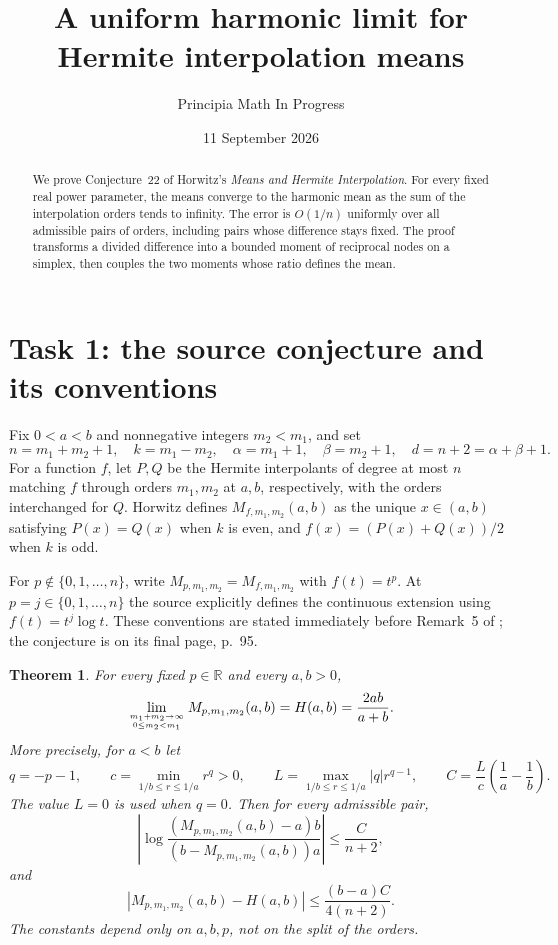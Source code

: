 \documentclass[11pt]{article}
\title{A uniform harmonic limit for Hermite interpolation means}
\author{Principia Math In Progress}
\date{11 September 2026}
\newtheorem{theorem}{Theorem}
\begin{document}
\maketitle

\begin{abstract}
We prove Conjecture~22 of Horwitz's \emph{Means and Hermite Interpolation}.
For every fixed real power parameter, the means converge to the harmonic
mean as the sum of the interpolation orders tends to infinity. The error
is $O(1/n)$ uniformly over all admissible pairs of orders, including pairs
whose difference stays fixed. The proof transforms a divided difference
into a bounded moment of reciprocal nodes on a simplex, then couples the
two moments whose ratio defines the mean.
\end{abstract}

\section*{Task 1: the source conjecture and its conventions}
Fix $0<a<b$ and nonnegative integers $m_2<m_1$, and set
\[
n=m_1+m_2+1,\quad k=m_1-m_2,\quad
\alpha=m_1+1,\quad\beta=m_2+1,\quad d=n+2=\alpha+\beta+1.
\]
For a function $f$, let $P,Q$ be the Hermite interpolants of degree at most
$n$ matching $f$ through orders $m_1,m_2$ at $a,b$, respectively, with
the orders interchanged for $Q$. Horwitz defines $M_{f,m_1,m_2}(a,b)$
as the unique $x\in(a,b)$ satisfying $P(x)=Q(x)$ when $k$ is even, and
$f(x)=(P(x)+Q(x))/2$ when $k$ is odd.

For $p\notin\{0,1,\ldots,n\}$, write $M_{p,m_1,m_2}=M_{f,m_1,m_2}$
with $f(t)=t^p$. At $p=j\in\{0,1,\ldots,n\}$ the source explicitly
defines the continuous extension using $f(t)=t^j\log t$.
These conventions are stated immediately before Remark~5 of
\cite{horwitz}; the conjecture is on its final page, p.~95.

\begin{theorem}\label{thm:main}
For every fixed $p\in\mathbb R$ and every $a,b>0$,
\[
\lim_{m_1+m_2\to\infty\atop 0\le m_2<m_1}
M_{p,m_1,m_2}(a,b)=H(a,b)=\frac{2ab}{a+b}.
\]
More precisely, for $a<b$ let
\[
q=-p-1,\qquad
c=\min_{1/b\le r\le1/a}r^q>0,\qquad
L=\max_{1/b\le r\le1/a}|q|r^{q-1},\qquad
C=\frac{L}{c}\left(\frac1a-\frac1b\right).
\]
The value $L=0$ is used when $q=0$. Then for every admissible pair,
\begin{equation}\label{eq:log-bound}
\left|\log\frac{(M_{p,m_1,m_2}(a,b)-a)b}
 {(b-M_{p,m_1,m_2}(a,b))a}\right|\le\frac{C}{n+2},
\end{equation}
and
\begin{equation}\label{eq:main-bound}
|M_{p,m_1,m_2}(a,b)-H(a,b)|
 \le\frac{(b-a)C}{4(n+2)}.
\end{equation}
The constants depend only on $a,b,p$, not on the split of the orders.
\end{theorem}
\end{document}
